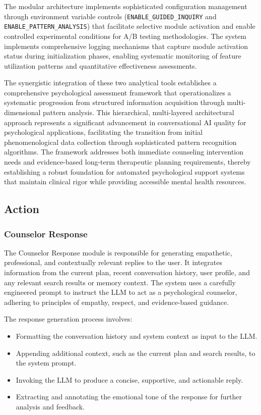The modular architecture implements sophisticated configuration management through environment variable controls (\texttt{ENABLE\_GUIDED\_INQUIRY} and \texttt{ENABLE\_PATTERN\_ANALYSIS}) that facilitate selective module activation and enable controlled experimental conditions for A/B testing methodologies. The system implements comprehensive logging mechanisms that capture module activation status during initialization phases, enabling systematic monitoring of feature utilization patterns and quantitative effectiveness assessments.

The synergistic integration of these two analytical tools establishes a comprehensive psychological assessment framework that operationalizes a systematic progression from structured information acquisition through multi-dimensional pattern analysis. This hierarchical, multi-layered architectural approach represents a significant advancement in conversational AI quality for psychological applications, facilitating the transition from initial phenomenological data collection through sophisticated pattern recognition algorithms. The framework addresses both immediate counseling intervention needs and evidence-based long-term therapeutic planning requirements, thereby establishing a robust foundation for automated psychological support systems that maintain clinical rigor while providing accessible mental health resources.

\subsection{Action}

\subsubsection{Counselor Response}

The Counselor Response module is responsible for generating empathetic, professional, and contextually relevant replies to the user. It integrates information from the current plan, recent conversation history, user profile, and any relevant search results or memory context. The system uses a carefully engineered prompt to instruct the LLM to act as a psychological counselor, adhering to principles of empathy, respect, and evidence-based guidance.

The response generation process involves:
\begin{itemize}
    \item Formatting the conversation history and system context as input to the LLM.
    \item Appending additional context, such as the current plan and search results, to the system prompt.
    \item Invoking the LLM to produce a concise, supportive, and actionable reply.
    \item Extracting and annotating the emotional tone of the response for further analysis and feedback.
\end{itemize}

